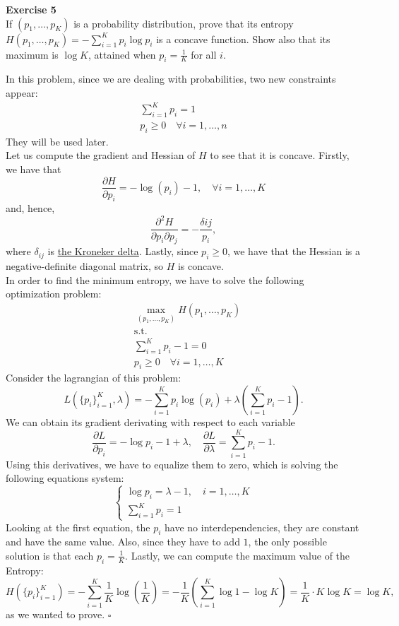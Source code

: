 \documentclass[11pt,table]{article}
\newcommand{\qed}{\hfill $\square$}
\newenvironment{problem}[2][Exercise]
    { \begin{mdframed}[backgroundcolor=gray!20] \textbf{#1 #2} \\}
    {  \end{mdframed}}
\begin{document}
\begin{problem}{5}
If \( (p_1,\dots,p_K) \) is a probability distribution, prove that its entropy \( H(p_1, \dots, p_K) = - \sum_{i=1}^K p_i \log p_i\) is a concave function. Show also that its maximum is \( \log K \), attained when \( p_i = \frac{1}{K}\) for all $i$.
\end{problem}


In this problem, since we are dealing with probabilities, two new constraints appear:
\begin{align*}
  \sum_{i=1}^K p_i = 1 \\
  p_i \geq 0 \quad \forall i =1,\dots,n
\end{align*}
They will be used later.\\

Let us compute the gradient and Hessian of \(H\) to see that it is concave. Firstly, we have that
\[
  \frac{\partial H}{\partial p_i} = - \log(p_i) - 1, \quad \forall i = 1,\dots,K
\]
and, hence,
\[
  \frac{\partial^2 H}{\partial p_i \partial p_j} = - \frac{\delta{ij}}{p_i},
\]
where $\delta_{ij}$ is \href{https://en.wikipedia.org/wiki/Kronecker_delta}{the Kroneker delta}. Lastly, since \(p_i \geq 0\), we have that the Hessian is a negative-definite diagonal matrix, so \(H\) is concave.\\

In order to find the minimum entropy, we have to solve the following optimization problem:
\begin{align*}
   & \max_{(p_1,\dots,p_K)} H(p_1,\dots,p_K) \\
   & \text{s.t.}                             \\
   & \sum_{i=1}^K p_i -1 = 0                 \\
   & p_i \geq 0 \quad \forall i =1,\dots,K
\end{align*}
Consider the lagrangian of this problem:
\[
  L\left(\{p_i\}_{i=1}^K, \lambda\right) = - \sum_{i=1}^K p_i \log(p_i) + \lambda\left(\sum_{i=1}^K p_i -1\right).
\]
We can obtain its gradient derivating with respect to each variable
\[
  \frac{\partial L}{\partial p_i} = - \log p_i - 1 + \lambda, \quad \frac{\partial L}{\partial \lambda} =  \sum_{i=1}^K p_i -1.
\]
Using this derivatives, we have to equalize them to zero, which is solving the following equations system:
\[
  \begin{cases}
    \log p_i = \lambda - 1, \quad i = 1,\dots,K \\
    \sum_{i=1}^K p_i = 1
  \end{cases}
\]
Looking at the first equation, the \(p_i\) have no interdependencies, they are constant and have the same value. Also, since they have to add \(1\), the only possible solution is that each \(p_i = \frac{1}{K}\). Lastly, we can compute the maximum value of the Entropy:
\[
  H\left(\{p_i\}_{i=1}^K\right) = - \sum_{i=1}^K \frac{1}{K} \log \left(\frac{1}{K}\right)  = - \frac{1}{K} \left(\sum_{i=1}^K \log 1 - \log K\right) = \frac{1}{K} \cdot K \log K = \log K,
\]
as we wanted to prove. \qed
\end{document}
